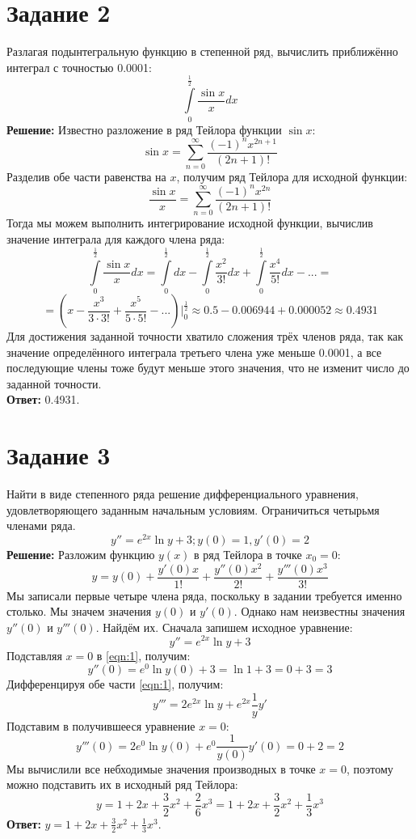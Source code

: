 \documentclass[a4paper,10pt]{article}
\begin{document}
\section*{Задание 2}
Разлагая подынтегральную функцию в степенной ряд, вычислить приближённо интеграл с точностью 0.0001:
$$
\int\limits_{0}^{\frac{1}{2}}\frac{\sin x}{x}dx
$$
\textbf{Решение:}
Известно разложение в ряд Тейлора функции $\sin x$:
$$
\sin x = \sum_{n = 0}^{\infty} \frac{(-1)^n x^{2n+1}}{(2n+1)!}
$$
Разделив обе части равенства на $x$, получим ряд Тейлора для исходной функции:
$$
\frac{\sin x}{x} = \sum_{n = 0}^{\infty} \frac{(-1)^n x^{2n}}{(2n+1)!}
$$
Тогда мы можем выполнить интегрирование исходной функции, вычислив значение интеграла для каждого члена ряда:
$$
\int\limits_{0}^{\frac{1}{2}}\frac{\sin x}{x}dx = \int\limits_{0}^{\frac{1}{2}}dx - \int\limits_{0}^{\frac{1}{2}}\frac{x^2}{3!}dx + \int\limits_{0}^{\frac{1}{2}}\frac{x^4}{5!}dx - ... =
$$
$$
= (x - \frac{x^3}{3\cdot3!} + \frac{x^5}{5\cdot5!} - ...)\bigg|_0^\frac{1}{2} \approx 0.5 - 0.006944 + 0.000052 \approx 0.4931
$$
Для достижения заданной точности хватило сложения трёх членов ряда, так как значение определённого интеграла третьего члена уже меньше 0.0001, а все последующие члены тоже будут меньше этого значения, что не изменит число до заданной точности.
\\
\textbf{Ответ:} 0.4931.

\section*{Задание 3}

Найти в виде степенного ряда решение дифференциального уравнения, удовлетворяющего заданным начальным условиям. Ограничиться четырьмя членами ряда.
$$
y'' = e^{2x}\ln y + 3; y(0) = 1, y'(0) = 2
$$
\textbf{Решение:}
Разложим функцию $y(x)$ в ряд Тейлора в точке $x_0 = 0$:
$$
y = y(0) + \frac{y'(0)x}{1!} + \frac{y''(0)x^2}{2!} + \frac{y'''(0)x^3}{3!}
$$
Мы записали первые четыре члена ряда, поскольку в задании требуется именно столько.
Мы значем значения $y(0)$ и $y'(0)$. Однако нам неизвестны значения $y''(0)$ и $y'''(0)$. Найдём их. Сначала запишем исходное уравнение:
\begin{equation}\label{eqn:1}
    y'' = e^{2x}\ln y + 3\tag{*}
\end{equation}
Подставляя $x = 0$ в \eqref{eqn:1}, получим:
$$
y''(0) = e^0\ln y(0) + 3 = \ln 1 + 3 = 0 + 3 = 3
$$
Дифференцируя обе части \eqref{eqn:1}, получим:
$$
y''' = 2e^{2x}\ln y + e^{2x}\frac{1}{y}y'
$$
Подставим в получившееся уравнение $x = 0$:
$$
y'''(0) = 2e^0\ln y(0) + e^0\frac{1}{y(0)}y'(0) = 0 + 2 = 2
$$
Мы вычислили все небходимые значения производных в точке $x = 0$, поэтому можно подставить их в исходный ряд Тейлора:
$$
y = 1 + 2x + \frac{3}{2}x^2 + \frac{2}{6}x^3 = 1 + 2x + \frac{3}{2}x^2 + \frac{1}{3}x^3
$$
\textbf{Ответ:} $y = 1 + 2x + \frac{3}{2}x^2 + \frac{1}{3}x^3$.
\end{document}
